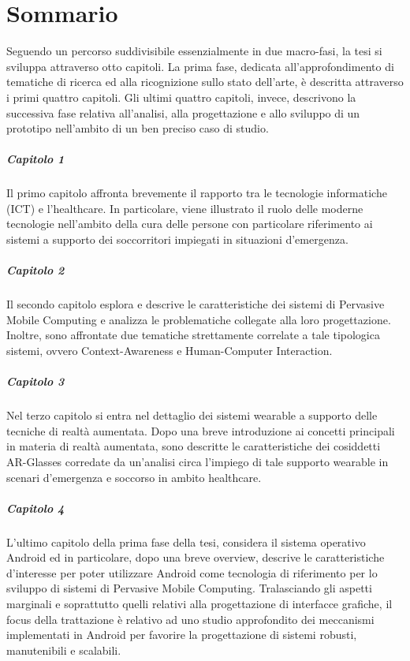 \chapter{Sommario}
Seguendo un percorso suddivisibile essenzialmente in due macro-fasi, la tesi si sviluppa attraverso otto capitoli. La prima fase, dedicata all'approfondimento di tematiche di ricerca ed alla ricognizione sullo stato dell'arte, è descritta attraverso i primi quattro capitoli. Gli ultimi quattro capitoli, invece, descrivono la successiva fase relativa all'analisi, alla progettazione e allo sviluppo di un prototipo nell'ambito di un ben preciso caso di studio. 

\paragraph{Capitolo 1}
Il primo capitolo affronta brevemente il rapporto tra le tecnologie informatiche (ICT) e l'healthcare. In particolare, viene illustrato il ruolo delle moderne tecnologie nell'ambito della cura delle persone con particolare riferimento ai sistemi a supporto dei soccorritori impiegati in situazioni d'emergenza.

\paragraph{Capitolo 2}
Il secondo capitolo esplora e descrive le caratteristiche dei sistemi di Pervasive Mobile Computing e analizza le problematiche collegate alla loro progettazione. Inoltre, sono affrontate due tematiche strettamente correlate a tale tipologica sistemi, ovvero Context-Awareness e Human-Computer Interaction.

\paragraph{Capitolo 3}
Nel terzo capitolo si entra nel dettaglio dei sistemi wearable a supporto delle tecniche di realtà aumentata. Dopo una breve introduzione ai concetti principali in materia di realtà aumentata, sono descritte le caratteristiche dei cosiddetti AR-Glasses corredate da un'analisi circa l'impiego di tale supporto wearable in scenari d'emergenza e soccorso in ambito healthcare.

\paragraph{Capitolo 4}
L'ultimo capitolo della prima fase della tesi, considera il sistema operativo Android ed in particolare, dopo una breve overview, descrive le caratteristiche d'interesse per poter utilizzare Android come tecnologia di riferimento per lo sviluppo di sistemi di Pervasive Mobile Computing. Tralasciando gli aspetti marginali e soprattutto quelli relativi alla progettazione di interfacce grafiche, il focus della trattazione è relativo ad uno studio approfondito dei meccanismi implementati in Android per favorire la progettazione di sistemi robusti, manutenibili e scalabili.


